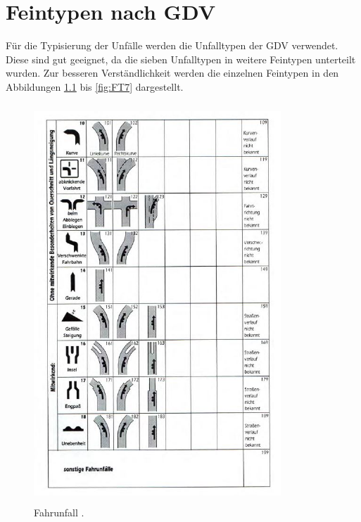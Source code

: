 
\chapter{Feintypen nach GDV}\label{chapter:Anhang1}

Für die Typisierung der Unfälle werden die Unfalltypen der GDV verwendet. Diese sind gut geeignet, da die sieben Unfalltypen in weitere Feintypen unterteilt wurden. Zur besseren Verständlichkeit werden die einzelnen Feintypen in den Abbildungen \ref{fig:FT1} bis \ref{fig:FT7} dargestellt. %

\begin{savenotes}
	\begin{figure}[H]
		\centering
		\includegraphics[width=9.3cm,height=15cm]{figures/FT1}
		\caption[Fahrunfall nach GDV]{Fahrunfall \parencite[S. 9]{GesamtverbandderDeutschenVersicherungswirtschafte.V..2016}. }\label{fig:FT1}
	\end{figure}
\end{savenotes}

